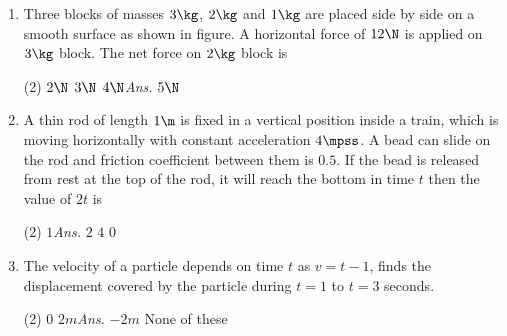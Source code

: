 \documentclass{article}
\newcommand{\ans}{\textcolor{red!95}{\textit{\quad Ans.}}}
\begin{document}
\begin{enumerate}
\item Three blocks of masses $3 \kg$, $2 \kg$ and $1 \kg$ are placed side by side on a smooth surface as shown in figure. A horizontal force of $12 \N$ is applied on $3 \kg$ block. The net force on $2 \kg$ block is
\begin{center}
\end{center} 
\begin{tasks}(2)
	\task $2\N$
	\task $3\N$
	\task $4\N$\ans
	\task $5\N$
\end{tasks}

\item A thin rod of length $1 \m$ is fixed in a vertical position inside a train, which is moving horizontally with constant acceleration $4 \mpss$. A bead can slide on the rod and friction
coefficient between them is $0.5$. If the bead is released from rest at the top of the rod, it will reach the bottom in time $t$ then the value of $2t$ is
\begin{tasks}(2)
	\task $1$\ans
	\task $2$
	\task $4$
	\task $0$
\end{tasks}

\item The velocity of a particle depends on time $t$ as $v=t-1$, finds the displacement covered by the particle during $t=1$ to $t=3$ seconds.
    \begin{center}
    \end{center}

\begin{tasks}(2)
	\task $0$
    \task $2 m$\ans
    \task $-2 m$
    \task None of these
\end{tasks}


\end{enumerate}
\end{document}
